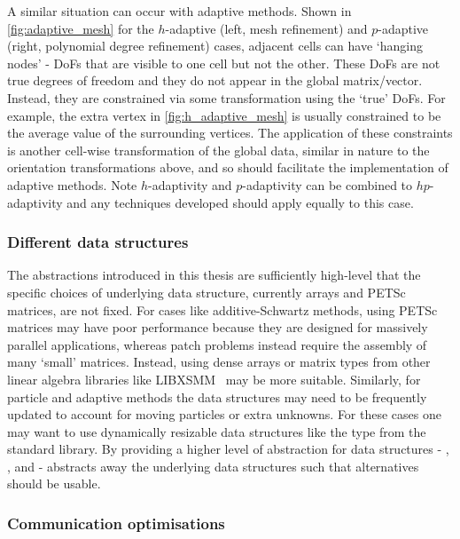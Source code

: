 \documentclass[thesis]{subfiles}
\begin{document}
A similar situation can occur with adaptive methods.
Shown in \cref{fig:adaptive_mesh} for the $h$-adaptive (left, mesh refinement) and $p$-adaptive (right, polynomial degree refinement) cases, adjacent cells can have `hanging nodes' - DoFs that are visible to one cell but not the other.
These DoFs are not true degrees of freedom and they do not appear in the global matrix/vector.
Instead, they are constrained via some transformation using the `true' DoFs.
For example, the extra vertex in \cref{fig:h_adaptive_mesh} is usually constrained to be the average value of the surrounding vertices.
The application of these constraints is another cell-wise transformation of the global data, similar in nature to the orientation transformations above, and so  should facilitate the implementation of adaptive methods.
Note $h$-adaptivity and $p$-adaptivity can be combined to $hp$-adaptivity and any techniques developed should apply equally to this case.

\subsubsection{Different data structures}

The abstractions introduced in this thesis are sufficiently high-level that the specific choices of underlying data structure, currently \numpy arrays and PETSc matrices, are not fixed.
For cases like additive-Schwartz methods, using PETSc matrices may have poor performance because they are designed for massively parallel applications, whereas patch problems instead require the assembly of many `small' matrices.
Instead, using dense arrays or matrix types from other linear algebra libraries like LIBXSMM~\cite{heineckeLIBXSMMAcceleratingSmall2016} may be more suitable.
Similarly, for particle and adaptive methods the data structures may need to be frequently updated to account for moving particles or extra unknowns.
For these cases one may want to use dynamically resizable data structures like the  type from the \cplusplus standard library.
By providing a higher level of abstraction for data structures - , , and  -  abstracts away the underlying data structures such that alternatives should be usable.

\subsubsection{Communication optimisations}
\end{document}
